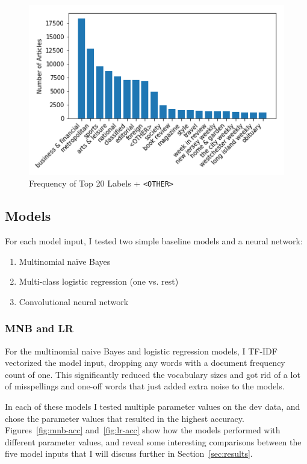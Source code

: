 \documentclass[11pt,a4paper,table]{article}
\begin{document}
\begin{figure}
\centering
\includegraphics[scale=0.55]{top_n_labels_histogram}
\caption{Frequency of Top 20 Labels + \small{\tt <OTHER>}}
\label{fig:topnhist}
\end{figure}

\subsection{Models}
\label{sec:models}

For each model input, I tested two simple baseline models and a neural network:

\begin{enumerate}
\item Multinomial na\"{i}ve Bayes
\item Multi-class logistic regression (one vs. rest)
\item Convolutional neural network
\end{enumerate}

\subsubsection{MNB and LR}
\label{sssec:mnb-lr}

For the multinomial naive Bayes and logistic regression models, I TF-IDF vectorized the model input, dropping any words with a document frequency count of one. This significantly reduced the vocabulary sizes and got rid of a lot of misspellings and one-off words that just added extra noise to the models.

In each of these models I tested multiple parameter values on the dev data, and chose the parameter values that resulted in the highest accuracy. Figures~\ref{fig:mnb-acc} and~\ref{fig:lr-acc} show how the models performed with different parameter values, and reveal some interesting comparisons between the five model inputs that I will discuss further in Section~\ref{sec:results}.
\end{document}

